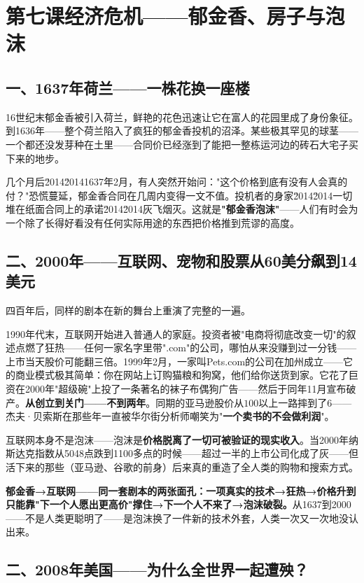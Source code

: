 \documentclass[a4paper,12pt]{ctexart}
\begin{document}
\newpage
\section{\textcolor{orange!80!black}{第七课\quad 经济危机——郁金香、房子与泡沫}}

\subsection*{一、1637年荷兰——一株花换一座楼}

16世纪末郁金香被引入荷兰，鲜艳的花色迅速让它在富人的花园里成了身份象征。到1636年——整个荷兰陷入了疯狂的郁金香投机的沼泽。某些极其罕见的球茎——一个都还没发芽种在土里——合同价已经涨到了能把一整栋运河边的砖石大宅子买下来的地步。

几个月后\u2014\u20141637年2月，有人突然开始问："这个价格到底有没有人会真的付？"恐慌蔓延，郁金香合同在几周内变得一文不值。投机者的身家\u2014\u2014一切堆在纸面合同上的承诺\u2014\u2014灰飞烟灭。这就是\textbf{"郁金香泡沫"}——人们有时会为一个除了长得好看没有任何实际用途的东西把价格推到荒谬的高度。

\subsection*{二、2000年——互联网、宠物和股票从60美分飙到14美元}

四百年后，同样的剧本在新的舞台上重演了完整的一遍。

1990年代末，互联网开始进入普通人的家庭。投资者被"电商将彻底改变一切"的叙述点燃了狂热——任何一家名字里带".com"的公司，哪怕从来没赚到过一分钱——上市当天股价可能翻三倍。1999年2月，一家叫Pets.com的公司在加州成立——它的商业模式极其简单：你在网站上订购猫粮和狗窝，他们给你送货到家。它花了巨资在2000年"超级碗"上投了一条著名的袜子布偶狗广告——然后于同年11月宣布破产。\textbf{从创立到关门——不到两年}。同期的亚马逊股价从$100以上一路摔到了$6——杰夫·贝索斯在那些年一直被华尔街分析师嘲笑为"\textbf{一个卖书的不会做利润}"。

互联网本身不是泡沫——泡沫是\textbf{价格脱离了一切可被验证的现实收入}。当2000年纳斯达克指数从5048点跌到1100多点的时候——超过一半的上市公司化成了灰——但活下来的那些（亚马逊、谷歌的前身）后来真的重造了全人类的购物和搜索方式。

\textbf{郁金香→互联网——同一套剧本的两张面孔：一项真实的技术→狂热→价格升到只能靠"下一个人愿出更高价"撑住→下一个人不来了→泡沫破裂。}从1637到2000——不是人类更聪明了——是泡沫换了一件新的技术外套，人类一次又一次地没认出来。

\subsection*{二、2008年美国——为什么全世界一起遭殃？}
\end{document}
